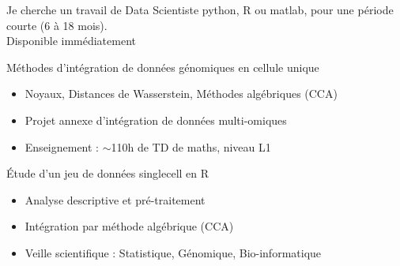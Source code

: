 \documentclass[10pt,a4paper]{altacv}
\begin{document}




\begin{fullwidth}
\makecvheader
\end{fullwidth}

 
\begin{fullwidth}
Je cherche un travail de Data Scientiste python, R ou matlab, pour une période courte (6 à 18 mois). \\
Disponible immédiatement
\end{fullwidth}


Méthodes d'intégration de données génomiques en cellule unique
\smallskip
\begin{itemize}
\item Noyaux, Distances de Wasserstein, Méthodes algébriques (CCA)
\item Projet annexe d'intégration de données multi-omiques
\item Enseignement : $\sim$110h de TD de maths, niveau L1
\end{itemize}
\smallskip

\'Etude d'un jeu de données singlecell en R
\smallskip%
\begin{itemize}
\item Analyse descriptive et pr\'e-traitement 
\item Intégration par méthode algébrique (CCA) 
\item Veille scientifique : Statistique, Génomique, Bio-informatique
\end{itemize}
\smallskip
\end{document}

